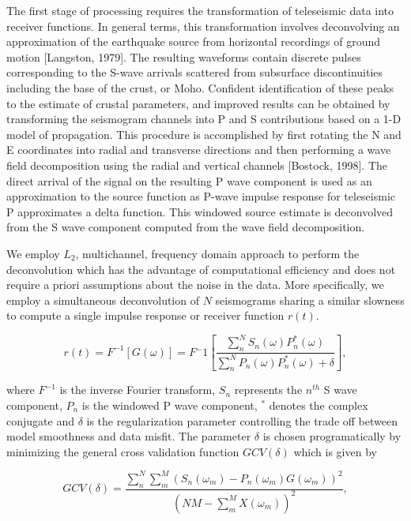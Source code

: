 \documentclass[draft, 12pt]{article}
\begin{document}
The first stage of processing requires the transformation of teleseismic data into receiver functions. In general terms, this transformation involves deconvolving an approximation of the earthquake source from horizontal recordings of ground motion [Langston, 1979]. The resulting waveforms contain discrete pulses corresponding to the S-wave arrivals scattered from subsurface discontinuities including the base of the crust, or Moho. Confident identification of these peaks to the estimate of crustal parameters, and improved results can be obtained by transforming the seismogram channels into P and S contributions based on a 1-D model of propagation. This procedure is accomplished by first rotating the N and E coordinates into radial and transverse directions and then performing a wave field decomposition using the radial and vertical channels [Bostock, 1998]. The direct arrival of the signal on the resulting P wave component is used as an approximation to the source function as P-wave impulse response for teleseismic P approximates a delta function. This windowed source estimate is deconvolved from the S wave component computed from the wave field decomposition.

We employ $L_2$, multichannel, frequency domain approach to perform the deconvolution which has the advantage of computational efficiency and does not require a priori assumptions about the noise in the data. More specifically, we employ a simultaneous deconvolution of $N$ seismograms sharing a similar slowness to compute a single impulse response or receiver function $r(t)$.

\begin{equation}
  r(t) = F^{-1} \left[ G(\omega) \right] = F{^-1}
 \left[ \frac {\sum_n^N S_n(\omega)P_n^*(\omega)} {\sum_n^N P_n(\omega)P_n^*(\omega) + \delta} \right ],
\end{equation}

where $F^{-1}$ is the inverse Fourier transform, $S_n$ represents the $n^{th}$ S wave component, $P_n$ is the windowed P wave component, $^*$ denotes the complex conjugate and $\delta$ is the regularization parameter controlling the trade off between model smoothness and data misfit. The parameter $\delta$ is chosen programatically by minimizing the general cross validation function $GCV(\delta)$ which is given by

\begin{equation}
  GCV(\delta) = \frac {\sum_n^N\sum_m^M \left( S_n(\omega_m) - P_n(\omega_m)G(\omega_m) \right)^2 }
                      { \left( NM - \sum_m^M X(\omega_m) \right)^2 },
\end{equation}
\end{document}
